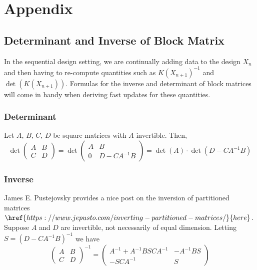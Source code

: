 \documentclass[12pt]{article}
\begin{document}
\section{Appendix}

\subsection{Determinant and Inverse of Block Matrix}
In the sequential design setting, we are continually adding data to the design $X_n$ and then having to re-compute quantities such as 
$K(X_{n+1})^{-1}$ and $\det\left(K(X_{n+1}) \right)$. Formulas for the inverse and determinant of block matrices will come in handy 
when deriving fast updates for these quantities. 

\subsubsection{Determinant}
Let $A$, $B$, $C$, $D$ be square matrices with $A$ invertible. Then, 
\[
\det\begin{pmatrix} A & B \\ C & D \end{pmatrix} = \det \begin{pmatrix} A & B \\ 0 & D - CA^{-1}B \end{pmatrix} = \det(A) \cdot 
\det\left(D - CA^{-1}B \right)
\]

\subsubsection{Inverse}
James E. Pustejovsky provides a nice post on the inversion of partitioned matrices $\href{https://www.jepusto.com/inverting-partitioned-matrices/}{here}$. Suppose $A$ and $D$ are invertible, not necessarily of 
equal dimension. Letting $S = \left(D - CA^{-1}B\right)^{-1}$ we have 
\[
\begin{pmatrix} A & B \\ C & D \end{pmatrix}^{-1} = \begin{pmatrix} A^{-1} + A^{-1}BSCA^{-1} & -A^{-1}BS \\
-SCA^{-1} & S \end{pmatrix}
\]
\end{document}

